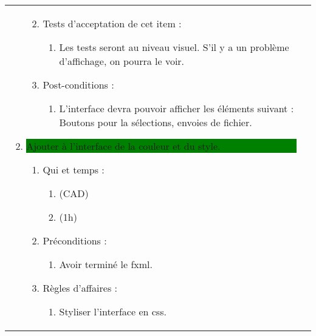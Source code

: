 \begin{longtable}{|l|p{}|}
\begin{enumerate}[label*=\arabic*.]
\begin{enumerate}[label*=\arabic*.]
\begin{enumerate}[label*=\arabic*.]
                                \end{enumerate}
                                \item Tests d'acceptation de cet item :
                                \begin{enumerate}[label*=\arabic*.]
                                    \item Les tests seront au niveau visuel. S'il y a un problème d'affichage, on pourra le voir.
                                \end{enumerate}
                                \item Post-conditions :
                                \begin{enumerate}[label*=\arabic*.]
                                    \item L'interface devra pouvoir afficher les éléments suivant : Boutons pour la sélections, envoies de fichier.
                                \end{enumerate}
                            \end{enumerate}
             \item \colorbox{Green}{\parbox{13cm}{Ajouter à l’interface de la couleur et du style.}}
                \begin{enumerate}[label*=\arabic*.]
                                \item Qui et temps :
                                \begin{enumerate}[label*=\arabic*.]
                                    \item (CAD)
                                    \item (1h)
                                \end{enumerate}
                                \item Préconditions :
                                \begin{enumerate}[label*=\arabic*.]
                                    \item Avoir terminé le fxml.
                                \end{enumerate}
                                \item Règles d'affaires :
                                \begin{enumerate}[label*=\arabic*.]
                                    \item Styliser l'interface en css.
                                \end{enumerate}

\end{enumerate}
\end{enumerate}
\end{longtable}
